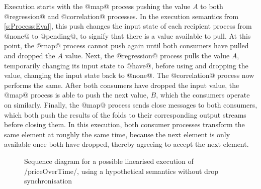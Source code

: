Execution starts with the @map@ process pushing the value $A$ to both @regression@ and @correlation@ processes.
In the execution semantics from \cref{s:Process:Eval}, this push changes the input state of each recipient process from @none@ to @pending@, to signify that there is a value available to pull.
At this point, the @map@ process cannot push again until both consumers have pulled and dropped the $A$ value.
Next, the @regression@ process pulls the value $A$, temporarily changing its input state to @have@, before using and dropping the value, changing the input state back to @none@.
The @correlation@ process now performs the same.
After both consumers have dropped the input value, the @map@ process is able to push the next value, $B$, which the consumers operate on similarly.
Finally, the @map@ process sends close messages to both consumers, which both push the results of the folds to their corresponding output streams before closing them.
In this execution, both consumer processes transform the same element at roughly the same time, because the next element is only available once both have dropped, thereby agreeing to accept the next element.


\begin{figure}
\center
\begin{sequencediagram}









\end{sequencediagram}
\caption[Sequence diagram of execution without drop synchronisation]{Sequence diagram for a possible linearised execution of \Hs/priceOverTime/, using a hypothetical semantics without drop synchronisation}
\label{figs/swim/drop/priceOverTime-nosync}
\end{figure}




